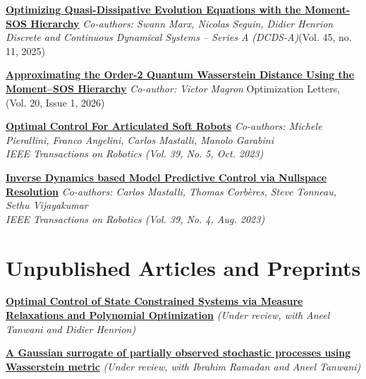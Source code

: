 \documentclass[letter]{res}
\begin{document}
\begin{resume}
\href{https://www.aimsciences.org/article/doi/10.3934/dcds.2025051}{\textbf{Optimizing Quasi-Dissipative Evolution Equations with the Moment-SOS Hierarchy}}\newline 
{\sl Co-authors: Swann Marx, Nicolas Seguin, Didier Henrion \\
Discrete and Continuous Dynamical Systems – Series A (DCDS-A)}(Vol. 45, no. 11, 2025)

\href{https://link.springer.com/article/10.1007/s11590-026-02285-x}{\textbf{Approximating the Order-2 Quantum Wasserstein Distance Using the Moment–SOS Hierarchy}} \newline
{\sl Co-author: Victor Magron}\newline
Optimization Letters, (Vol. 20, Issue 1, 2026)


\href{https://doi.org/10.1109/TRO.2023.3288837}{\textbf{Optimal Control For Articulated Soft Robots}}\newline
{\sl Co-authors: Michele Pierallini, Franco Angelini, Carlos Mastalli, Manolo Garabini \\
IEEE Transactions on Robotics (Vol. 39, No. 5, Oct. 2023)}

\href{https://doi.org/10.1109/TRO.2023.3262186}{\textbf{Inverse Dynamics based Model Predictive Control via Nullspace Resolution}}\newline 
{\sl Co-authors: Carlos Mastalli, Thomas Corbères, Steve Tonneau, Sethu Vijayakumar\\
IEEE Transactions on Robotics (Vol. 39, No. 4, Aug. 2023)}







\section{\textcolor{Bittersweet}{Unpublished Articles and Preprints}}

\href{https://spykspeigel.github.io/OCNSD/OCNsd.pdf}{\textbf{Optimal Control of State Constrained Systems via Measure Relaxations and Polynomial Optimization}}\newline 
\textsl{(Under review, with Aneel Tanwani and Didier Henrion)}

\href{https://hal.science/hal-05487303}{\textbf{A Gaussian surrogate of partially observed stochastic processes using Wasserstein metric}} \newline
\textsl{(Under review, with Ibrahim Ramadan and Aneel Tanwani)}


\end{resume}
\end{document}
